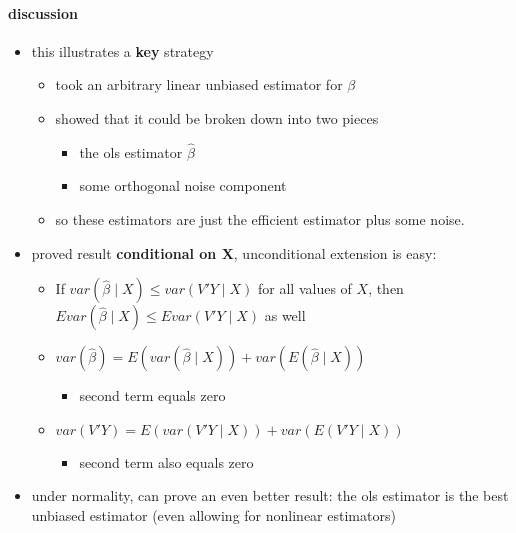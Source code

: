 \paragraph{discussion}
\begin{itemize}
\item this illustrates a \textbf{key} strategy
\begin{itemize}
\item took an arbitrary linear unbiased estimator for $\beta$
\item showed that it could be broken down into two pieces
\begin{itemize}
\item the ols estimator $\hat\beta$
\item some orthogonal noise component
\end{itemize}
\item so these estimators are just the efficient estimator plus
            some noise.
\end{itemize}
\item proved result \textbf{conditional on X}, unconditional extension is easy:
\begin{itemize}
\item If $var(\hat\beta \mid X) \leq var(V'Y \mid X)$ for all
            values of $X$, then $E var(\hat\beta \mid X) \leq E var(V'Y
            \mid X)$ as well
\item $var(\hat\beta) = E(var(\hat\beta \mid X)) + var(E(\hat\beta
            \mid X))$
\begin{itemize}
\item second term equals zero
\end{itemize}
\item $var(V'Y) = E(var(V'Y \mid X)) + var(E(V'Y \mid X))$
\begin{itemize}
\item second term also equals zero
\end{itemize}
\end{itemize}
\item under normality, can prove an even better result: the ols
          estimator is the best unbiased estimator (even allowing for
          nonlinear estimators)
\end{itemize}

